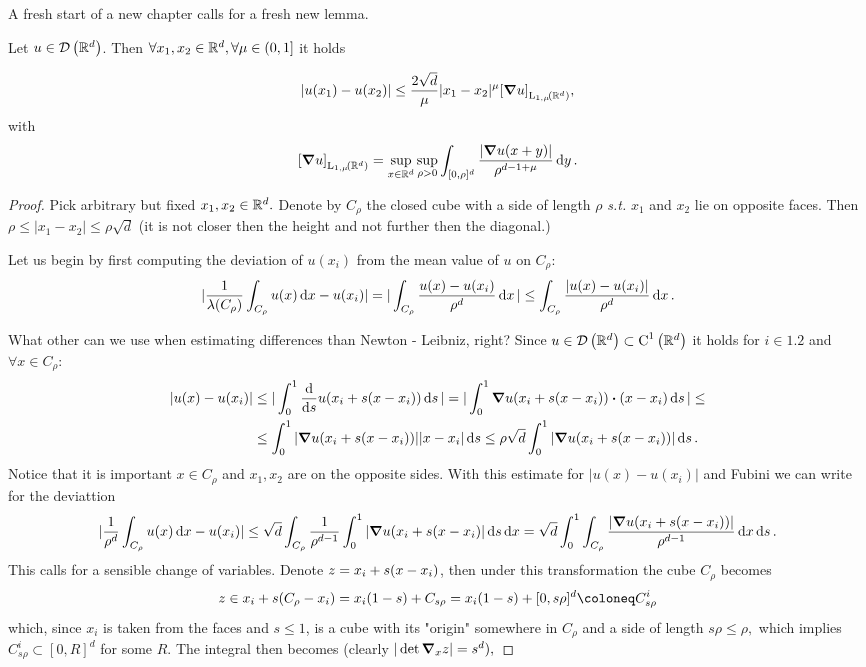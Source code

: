 \documentclass{article}
\begin{document}
A fresh start of a new chapter calls for a fresh new lemma.

\begin{lemma}[Morrey]
	Let $u \in \mathcal{D}\!\,\left({\mathbb R}^{d} \right)$. Then $\forall x_1, x_2 \in {\mathbb R}^{d}, \forall \mu \in (0,1]$ it holds

	\[
		|u(x_1) - u(x_2)| \leq \frac{2 \sqrt{d}}{\mu}|x_1 - x_2|^{\mu} \qty[\grad u]_{\LpSet[1,\mu]{\R^{d}}},
	\]
	with
	\[
		\qty[\grad u]_{\LpSet[1,\mu]{\R^{d}}} = \sup_{x \in \R^{d}} \sup_{\rho >0} \int_{[0,\rho]^d}\frac{|\grad u(x+y)|}{\rho^{d-1+\mu}}\dd{y}.
	\]
\end{lemma}

\begin{proof}
	Pick arbitrary but fixed $x_1, x_2 \in {\mathbb R}^{d}.$ Denote by $C_{\rho}$ the closed cube with a side of length $\rho$ \textit{s.t.} $x_1$ and $x_2$ lie on opposite faces. Then $\rho \leq |x_1 - x_2| \leq \rho \sqrt{d}$ (it is not closer then the height and not further then the diagonal.)

Let us begin by first computing the deviation of $u(x_i)$ from the mean value of $u$ on $C_{\rho}$:
	\[
		|\frac{1}{\lambda\qty(C_{\rho})} \int_{C_{\rho}}u(x)\dd{x} - u(x_i)| = |\int_{C_{\rho}}\frac{u(x)-u(x_i)}{\rho^d}\dd{x}| \leq \int_{C_{\rho}}\frac{|u(x)-u(x_i)|}{\rho^d}\dd{x}.
	\]

	What other can we use when estimating differences than Newton - Leibniz, right? Since $u \in \mathcal{D}\!\,\left({\mathbb R}^{d} \right)\subset \text{C}^{1}\!\,\left({\mathbb R}^{d} \right)$ it holds for $i \in \qty{1,2}$ and $\forall x \in C_{\rho}:$
	\begin{align*}
		|u(x) - u(x_i)| &\leq |\int_0^1 \dv{s} u\qty(x_i + s\qty(x-x_i))\dd{s}| = |\int_0^1 \grad u\qty(x_i + s(x-x_i)) \vdot (x-x_i)\dd{s}|\leq \\
				&\leq \int_0^1 |\grad u(x_i + s(x-x_i))| |x-x_i| \dd{s} \leq \rho \sqrt{d} \int_0^1 |\grad u(x_i + s(x-x_i))| \dd{s}.
	\end{align*}
	Notice that it is important $x \in C_{\rho}$ and $x_1, x_2$ are on the opposite sides.	With this estimate for $|u(x) - u(x_i)|$ and Fubini we can write for the deviattion
	\[
		|\frac{1}{\rho^d}\int_{C_{\rho}}u(x)\dd{x} - u(x_i)| \leq \sqrt{d} \int_{C_{\rho}}\frac{1}{\rho^{d-1}}\int_0^1 |\grad u(x_i + s(x - x_i)|\dd{s}\dd{x} = \sqrt{d}\int_0^1 \int_{C_{\rho}}\frac{|\grad u(x_i + s(x-x_i))|}{\rho^{d-1}}\dd{x}\dd{s}.
	\]
	This calls for a sensible change of variables. Denote $z = x_i + s\qty(x-x_i)$, then under this transformation the cube $C_{\rho}$ becomes
	\[
		z \in x_i + s(C_{\rho}-x_i) = x_i\qty(1-s) + C_{s \rho} = x_i\qty(1-s) + [0, s \rho]^{d} \coloneq C^i_{s \rho}
	\]
	which, since $x_i$ is taken from the faces and $s \leq 1$, is a cube with its "origin" somewhere in $C_{\rho}$ and a side of length $s \rho \leq \rho,$ which implies $C_{s \rho}^i \subset [0,R]^d$ for some $R$. The integral then becomes (clearly $|\det \grad_x z| = s^d),$


\end{proof}
\end{document}
